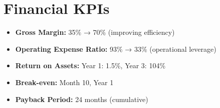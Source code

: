 \section{Financial KPIs}

\begin{itemize}
    \item \textbf{Gross Margin:} 35\% → 70\% (improving efficiency)
    \item \textbf{Operating Expense Ratio:} 93\% → 33\% (operational leverage)
    \item \textbf{Return on Assets:} Year 1: 1.5\%, Year 3: 104\%
    \item \textbf{Break-even:} Month 10, Year 1
    \item \textbf{Payback Period:} 24 months (cumulative)
\end{itemize}

